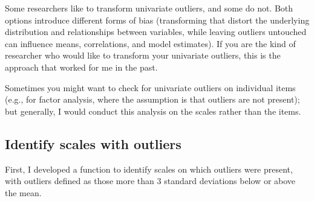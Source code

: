\documentclass[
  letterpaper,
  DIV=11,
  numbers=noendperiod]{scrreprt}
\begin{document}
Some researchers like to transform univariate outliers, and some do not.
Both options introduce different forms of bias (transforming that
distort the underlying distribution and relationships between variables,
while leaving outliers untouched can influence means, correlations, and
model estimates). If you are the kind of researcher who would like to
transform your univariate outliers, this is the approach that worked for
me in the past.

\begin{tcolorbox}[enhanced jigsaw, toprule=.15mm, coltitle=black, colframe=quarto-callout-note-color-frame, colbacktitle=quarto-callout-note-color!10!white, opacityback=0, left=2mm, breakable, rightrule=.15mm, bottomrule=.15mm, leftrule=.75mm, titlerule=0mm, arc=.35mm, opacitybacktitle=0.6, toptitle=1mm, bottomtitle=1mm, title=\textcolor{quarto-callout-note-color}{\faInfo}\hspace{0.5em}{Note}, colback=white]

Sometimes you might want to check for univariate outliers on individual
items (e.g., for factor analysis, where the assumption is that outliers
are not present); but generally, I would conduct this analysis on the
scales rather than the items.

\end{tcolorbox}

\subsection{Identify scales with
outliers}\label{identify-scales-with-outliers}

First, I developed a function to identify scales on which outliers were
present, with outliers defined as those more than 3 standard deviations
below or above the mean.
\end{document}

